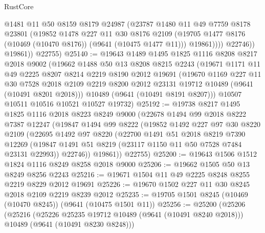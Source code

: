 \begin{lexlean}{RustCore}
\begin{coremodule}
                  @1481
                  @11
                  @50
                  @8159
                  @8179
                  @24987
                  (@23787
                    @1480
                    @11
                    @49
                    @7759
                    @8178
                    @23801
                    (@19852
                      @1478
                      @227
                      @11
                      @30
                      @8176
                      @2109
                      (@19705 @1477 @8176 (@10469 (@10470 @8176)) (@9641 (@10475 @1477 @11)))
                      @19861))))
              @22746))
          @19861))
      @22755)
@25140 := @19643
    @1489
    @1495
    @1825
    @1116
    @8208
    @8217
    @2018
    @9002
    (@19662
      @1488
      @50
      @13
      @8208
      @8215
      @2243
      (@19671
        @1171
        @11
        @49
        @2225
        @8207
        @8214
        @2219
        @8190
        @2012
        @19691
        (@19670
          @1169
          @227
          @11
          @30
          @7528
          @2018
          @2109
          @2219
          @8200
          @2012
          @23131
          @19712
          @10489
          (@9641 (@10491 @8201 @2018)))
        @10489
        (@9641 (@10491 @8191 @8207)))
      @10507
      @10511
      @10516
      @10521
      @10527
      @19732)
@25192 := @19738
    @8217
    @1495
    @1825
    @1116
    @2018
    @8223
    @8249
    @9000
    (@22678
      @1494
      @99
      @2018
      @8222
      @7387
      @12247
      (@19847
        @1494
        @99
        @8222
        (@19852
          @1492
          @227
          @97
          @30
          @8220
          @2109
          (@22695
            @1492
            @97
            @8220
            (@22700
              @1491
              @51
              @2018
              @8219
              @7390
              @12269
              (@19847 @1491 @51 @8219 (@23117 @1150 @11 @50 @7528 @7484 @23131 @22993))
              @22746))
          @19861))
      @22755)
@25200 := @19643 @1506 @1512 @1824 @1116 @8249 @8258 @2018 @9000
@25206 := @19662 @1505 @50 @13 @8249 @8256 @2243
@25216 := @19671 @1504 @11 @49 @2225 @8248 @8255 @2219 @8229 @2012 @19691
@25226 := @19670 @1502 @227 @11 @30 @8245 @2018 @2109 @2219 @8239 @2012
@25235 := @19705 @1501 @8245 (@10469 (@10470 @8245)) (@9641 (@10475 @1501 @11))
@25256 := @25200
    (@25206
      (@25216
        (@25226 @25235 @19712 @10489 (@9641 (@10491 @8240 @2018)))
        @10489
        (@9641 (@10491 @8230 @8248)))

\end{coremodule}
\end{lexlean}
